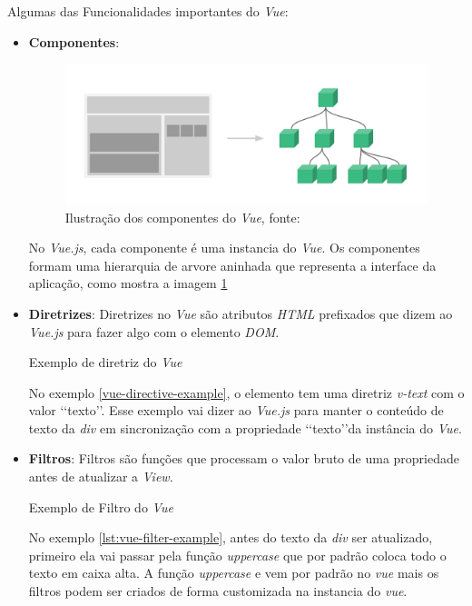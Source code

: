 Algumas das Funcionalidades importantes do \textit{Vue}:

\begin{itemize}
    \item \textbf{Componentes}:
    \begin{figure}[h]
        \centering
        \label{fig:vue-components}
        \includegraphics[keepaspectratio=true,scale=0.25]{figuras/vue-components.png}
        \caption{Ilustração dos componentes do \textit{Vue}, fonte: \cite{vuejs}}
    \end{figure}

    No \textit{Vue.js}, cada componente é uma instancia do \textit{Vue}. Os componentes formam uma hierarquia de arvore aninhada que representa a interface da aplicação, como mostra a imagem \ref{fig:vue-components}

    \item \textbf{Diretrizes}:
    Diretrizes no \textit{Vue} são atributos \textit{HTML} prefixados que dizem ao \textit{Vue.js} para fazer algo com o elemento \textit{DOM}.
    \begin{listing}[H]
        \caption{Exemplo de diretriz do \textit{Vue}}
        \label{lst:vue-directive-example}
    \end{listing}
    No exemplo \ref{vue-directive-example}, o elemento tem uma diretriz \textit{v-text} com o valor \lq\lq texto\rq\rq. Esse exemplo vai dizer ao \textit{Vue.js} para manter o conteúdo de texto da \textit{div} em sincronização com a propriedade \lq\lq texto\rq\rq da instância do \textit{Vue}.

    \item \textbf{Filtros}:
    Filtros são funções que processam o valor bruto de uma propriedade antes de atualizar a \textit{View}.
        \begin{listing}[H]
            \caption{Exemplo de Filtro do \textit{Vue}}
            \label{lst:vue-filter-example}
        \end{listing}
    No exemplo \ref{lst:vue-filter-example}, antes do texto da \textit{div} ser atualizado, primeiro ela vai passar pela função \textit{uppercase} que por padrão coloca todo o texto em caixa alta. A função \textit{uppercase} e vem por padrão no \textit{vue} mais os filtros podem ser criados de forma customizada na instancia do \textit{vue}.
\end{itemize}
\newpage
